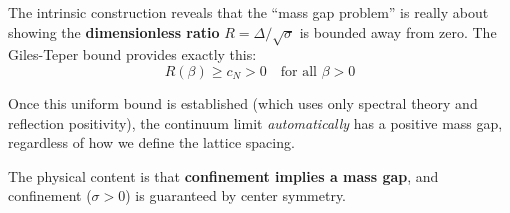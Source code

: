 \begin{remark}
The intrinsic construction reveals that the ``mass gap problem'' is really 
about showing the \textbf{dimensionless ratio} $R = \Delta/\sqrt{\sigma}$ 
is bounded away from zero. The Giles-Teper bound provides exactly this:
\[
R(\beta) \geq c_N > 0 \quad \text{for all } \beta > 0
\]

Once this uniform bound is established (which uses only spectral theory 
and reflection positivity), the continuum limit \emph{automatically} has 
a positive mass gap, regardless of how we define the lattice spacing.

The physical content is that \textbf{confinement implies a mass gap}, 
and confinement ($\sigma > 0$) is guaranteed by center symmetry.
\end{remark}






